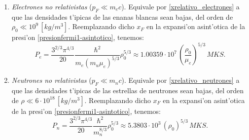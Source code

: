 \begin{enumerate}
\begin{enumerate}
\item \emph{Electrones no relativistas} ($p_F\ll m_{e}c$). Equivale por  \eqref{xrelativo_electrones} a que las densidades t'ipicas de las enanas blancas sean bajas, del orden de $\rho_0\ll10^{9}\,[kg/m^3]$. Reemplazando dicho $x_F$ en la expansi'on asint'otica de la presi'on \eqref{presionfermi1-asintotico}, tenemos:
\begin{equation}\label{fermi_norelativista}
 \boxed{P_e=\frac{3^{2/3}\pi^{4/3}}{20}\frac{\hbar^2}{m_e(m_u\mu_e)^{5/3}}\rho_0^{5/3}\approx1.00359\cdot 10^{7}\,\left(\frac{\rho_0}{\mu_e}\right)^{5/3}\,MKS.}
\end{equation}

\item \emph{Neutrones no relativistas} ($p_F\ll m_{n}c$). Equivale por  \eqref{xrelativo_neutrones} a que las densidades t'ipicas de las estrellas de neutrones sean bajas, del orden de $\rho\ll6\cdot10^{18}\,[kg/m^3]$.  Reemplazando dicho $x_F$ en la expansi'on asint'otica de la presi'on \eqref{presionfermi1-asintotico}, tenemos:
\begin{equation}\label{fermi_norelativista2}
 \boxed{P_n=\frac{3^{2/3}\pi^{4/3}}{20}\frac{\hbar^2}{m_n^{8/3}}\rho_0^{5/3}\approx5.3803\cdot 10^{3}\,\left(\rho_0\right)^{5/3}\,MKS.}
\end{equation}


\end{enumerate}
\end{enumerate}
